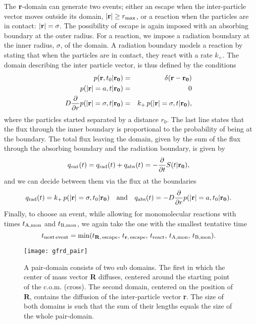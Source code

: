 The ${\bf r}$-domain can generate two events; either an escape when the inter-particle vector moves outside its domain, $|{\bf r}|\geq  r_{\rm max}$, or a reaction when the particles are in contact: $|{\bf r}|=\sigma$. The possibility of escape is again imposed with an absorbing boundary at the outer radius. For a reaction, we impose a radiation boundary at the inner radius, $\sigma$, of the domain. A radiation boundary models a reaction by stating that when the particles are in contact, they react with a rate $k_+$. The domain describing the inter particle vector, is thus defined by the conditions
\setlength{\jot}{10pt}
\begin{eqnarray}
 p({\bf r}, t_0|{\bf r_0}) & = & \delta(\mathbf{r - r_0}) \\
 p({\bf |r|}=a, t|{\bf r_0}) & = & 0 \\
 D \frac{\partial }{\partial r} p({\bf |r|}=\sigma, t|{\bf r_0}) & = & k_+\,p({\bf |r|}=\sigma, t|{\bf r_0}),
\end{eqnarray}
where the particles started separated by a distance $r_0$. The last line states that the flux through the inner boundary is proportional to the probability of being at the boundary. The total flux leaving the domain, given by the sum of the flux through the absorbing boundary and the radiation boundary, is given by
\begin{equation}
 q_{\rm out}(t) = q_{\rm rad}(t) + q_{\rm abs}(t) = -\frac{\partial }{\partial t} S(t|{\bf r_0}),
\end{equation}
and we can decide between them via the flux at the boundaries
\begin{equation}
q_{\rm rad}(t) = k_+ \, p({\bf |r|}=\sigma, t_0|{\bf r_0}) \quad{\rm and}\quad q_{\rm abs}(t) = - D \frac{\partial }{\partial r} p({\bf |r|}=a, t_0|{\bf r_0}).
\end{equation}
Finally, to choose an event, while allowing for monomolecular reactions with times $t_{\rm A, mon}$ and $t_{\rm B, mon}$, we again take the one with the smallest tentative time
\begin{equation}
 t_{\rm next\,event} = {\rm min}(t_{{\bf R},\,{\rm escape}},\,t_{{\bf r},\,{\rm escape}},\,t_{\rm react},\,t_{\rm A, mon},\,t_{\rm B, mon}).
\end{equation}

\begin{figure}[ht]
\centering
\texttt{[image: gfrd\_pair]}
\caption{ A pair-domain consists of two sub domains. The first in which the center of mass vector {\bf R} diffuses, centered around the starting point of the c.o.m. (cross). The second domain, centered on the position of {\bf R}, contains the diffusion of the inter-particle vector {\bf r}. The size of both domains is such that the sum of their lengths equals the size of the whole pair-domain. }
\end{figure}

